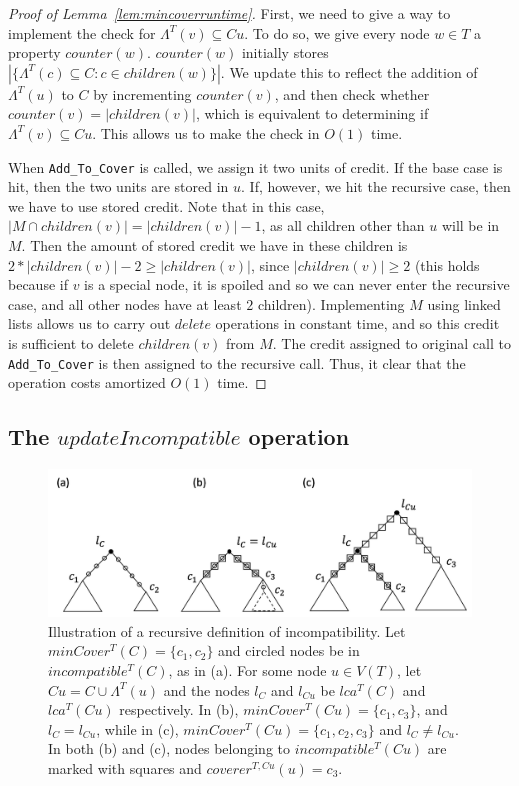 \documentclass{article}
\newcommand{\leafset}{\Lambda}
\begin{document}
    \begin{proof}[Proof of Lemma~\ref{lem:mincoverruntime}]
        First, we need to give a way to implement the check for $\leafset^{T}(v) \subseteq Cu$. To do so, we give every node $w \in T$ a property $counter(w)$. $counter(w)$ initially stores $|\{\leafset^{T}(c) \subseteq C : c \in children(w)\}|$. We update this to reflect the addition of $\leafset^{T}(u)$ to $C$ by incrementing $counter(v)$, and then check whether $counter(v) = |children(v)|$, which is equivalent to determining if $\leafset^{T}(v) \subseteq Cu$. This allows us to make the check in $O(1)$ time.

        When \texttt{Add\_To\_Cover} is called, we assign it two units of credit. If the base case is hit, then the two units are stored in $u$. If, however, we hit the recursive case, then we have to use stored credit. Note that in this case, $|M \cap children(v)| = |children(v)| - 1$, as all children other than $u$ will be in $M$. Then the amount of stored credit we have in these children is $2 * |children(v)| - 2 \geq |children(v)|$, since $|children(v)| \geq 2$ (this holds because if $v$ is a special node, it is spoiled and so we can never enter the recursive case, and all other nodes have at least $2$ children). Implementing $M$ using linked lists allows us to carry out $delete$ operations in constant time, and so this credit is sufficient to delete $children(v)$ from $M$. The credit assigned to original call to \texttt{Add\_To\_Cover} is then assigned to the recursive call. Thus, it clear that the operation costs amortized $O(1)$ time.
    \end{proof}

    \subsection{The $updateIncompatible$ operation}
    \label{subsec:updateincompatible}

    \begin{figure}[ht]
        \includegraphics[scale=0.6]{incompatibilityrecursive}
        \centering
        \caption[Recursively defining incompatibility]{Illustration of a recursive definition of incompatibility. Let $minCover^{T}(C) = \{c_1, c_2\}$ and circled nodes be in $incompatible^{T}(C)$, as in (a). For some node $u \in V(T)$, let $Cu = C \cup \leafset^{T}(u)$ and the nodes $l_C$ and $l_{Cu}$ be $lca^{T}(C)$ and $lca^{T}(Cu)$ respectively. In (b), $minCover^{T}(Cu) = \{c_1, c_3\}$, and $l_C = l_{Cu}$, while in (c), $minCover^{T}(Cu) = \{c_1, c_2, c_3\}$ and $l_C \neq l_{Cu}$. In both (b) and (c), nodes belonging to $incompatible^{T}(Cu)$ are marked with squares and $coverer^{T, Cu}(u) = c_3$.}
        \label{fig:incompatibilityrecursive}
    \end{figure}
\end{document}
